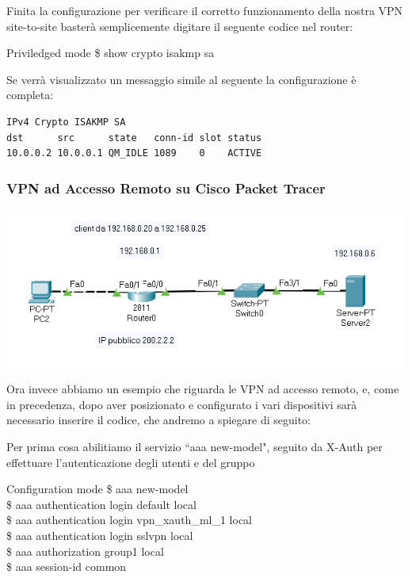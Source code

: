 Finita la configurazione per verificare il corretto funzionamento della nostra VPN site-to-site basterà semplicemente digitare il seguente codice nel router:

\begin{fcmds}{Priviledged mode}
    \$ show crypto isakmp sa
\end{fcmds}

Se verrà visualizzato un messaggio simile al seguente la configurazione è completa:

\begin{verbatim}
IPv4 Crypto ISAKMP SA
dst      src      state   conn-id slot status
10.0.0.2 10.0.0.1 QM_IDLE 1089    0    ACTIVE
\end{verbatim}

\subsubsection{VPN ad Accesso Remoto su Cisco Packet Tracer}
\begin{center}
    \includegraphics[width=\linewidth]{images/07.routing-sicurezza/vpn/02.png}
\end{center}

Ora invece abbiamo un esempio che riguarda le VPN ad accesso remoto, e, come in precedenza, dopo aver posizionato e configurato i vari dispositivi sarà necessario inserire il codice, che andremo a spiegare di seguito: 

Per prima cosa abilitiamo il servizio “aaa new-model", seguito da X-Auth per effettuare l’autenticazione degli utenti e del gruppo

\begin{fcmds}{Configuration mode}
    \$ aaa new-model\\
    \$ aaa authentication login default local\\
    \$ aaa authentication login vpn\_xauth\_ml\_1 local\\
    \$ aaa authentication login sslvpn local\\
    \$ aaa authorization group1 local\\
    \$ aaa session-id common
\end{fcmds}

